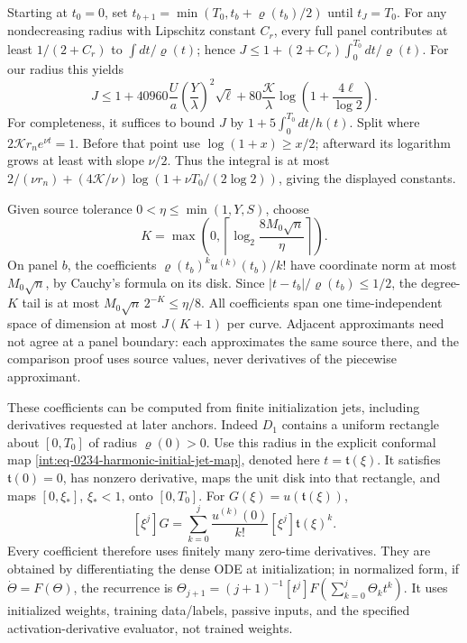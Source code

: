 Starting at \(t_0=0\), set
\(t_{b+1}=\min(T_0,t_b+\varrho(t_b)/2)\) until \(t_J=T_0\).
For any nondecreasing radius with Lipschitz constant \(C_r\), every
full panel contributes at least \(1/(2+C_r)\) to
\(\int dt/\varrho(t)\); hence
\(J\le1+(2+C_r)\int_0^{T_0}dt/\varrho(t)\).
For our radius this yields
\begin{equation}
 J\le1+40960\frac Ua\left(\frac Y\lambda\right)^2\sqrt\ell
       +80\frac{\mathcal K}{\lambda}
                  \log\left(1+\frac{4\ell}{\log2}\right).
 \label{eq:panel-panel-count}
\end{equation}
For completeness, it suffices to bound \(J\) by
\(1+5\int_0^{T_0}dt/h(t)\).  Split where
\(2\mathcal K r_ne^{\nu t}=1\).  Before that point use
\(\log(1+x)\ge x/2\); afterward its logarithm grows at least
with slope \(\nu/2\).  Thus the integral is at most
\(2/(\nu r_n)+(4\mathcal K/\nu)
\log(1+\nu T_0/(2\log2))\), giving the displayed constants.

Given source tolerance \(0<\eta\le\min(1,Y,S)\), choose
\begin{equation}
 K=\max\left(0,\left\lceil\log_2\frac{8M_0\sqrt n}{\eta}
                                          \right\rceil\right).
 \label{eq:panel-degree}
\end{equation}
On panel \(b\), the coefficients
\(\varrho(t_b)^ku^{(k)}(t_b)/k!\) have coordinate norm at most
\(M_0\sqrt n\), by Cauchy's formula on its disk.  Since
\(|t-t_b|/\varrho(t_b)\le1/2\), the degree-\(K\) tail is at
most \(M_0\sqrt n\,2^{-K}\le\eta/8\).  All coefficients span
one time-independent space of dimension at most \(J(K+1)\) per
curve.  Adjacent approximants need not agree at a panel boundary:
each approximates the same source there, and the comparison proof
uses source values, never derivatives of the piecewise approximant.

These coefficients can be computed from finite initialization jets,
including derivatives requested at later anchors.  Indeed \(D_1\)
contains a uniform rectangle about \([0,T_0]\) of radius
\(\varrho(0)>0\).  Use this radius in the explicit conformal map
\eqref{int:eq-0234-harmonic-initial-jet-map}, denoted here
\(t=\mathfrak t(\xi)\).  It satisfies \(\mathfrak t(0)=0\),
has nonzero derivative, maps the unit disk into that rectangle, and
maps \([0,\xi_*]\), \(\xi_*<1\), onto \([0,T_0]\).
For \(G(\xi)=u(\mathfrak t(\xi))\),
\[
 [\xi^j]G=\sum_{k=0}^j\frac{u^{(k)}(0)}{k!}
                              [\xi^j]\mathfrak t(\xi)^k.
\]
Every coefficient therefore uses finitely many zero-time derivatives.
They are obtained by differentiating the dense ODE at initialization;
in normalized form, if \(\dot\Theta=F(\Theta)\), the recurrence is
\(\Theta_{j+1}=(j+1)^{-1}[t^j]F(\sum_{k=0}^j\Theta_kt^k)\).
It uses initialized weights, training data/labels, passive inputs,
and the specified activation-derivative evaluator, not trained weights.

